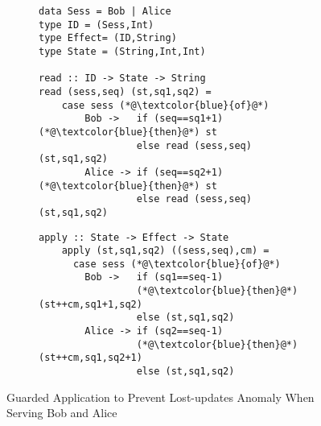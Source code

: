 \begin{figure}[t]
	\centering
	\begin{subfigure}[t]{0.5\textwidth}
	\begin{lstlisting}
data Sess = Bob | Alice
type ID = (Sess,Int) 
type Effect= (ID,String)
type State = (String,Int,Int)
	
read :: ID -> State -> String
read (sess,seq) (st,sq1,sq2) = 
	case sess (*@\textcolor{blue}{of}@*) 
		Bob ->   if (seq==sq1+1) (*@\textcolor{blue}{then}@*) st
		         else read (sess,seq)(st,sq1,sq2)
		Alice -> if (seq==sq2+1) (*@\textcolor{blue}{then}@*) st
		         else read (sess,seq)(st,sq1,sq2)
	\end{lstlisting}		  
	\end{subfigure}
	\hfill
	\begin{subfigure}[t]{0.42\textwidth}
	\begin{lstlisting}[firstnumber=13]
	apply :: State -> Effect -> State 
	apply (st,sq1,sq2) ((sess,seq),cm) = 
	  case sess (*@\textcolor{blue}{of}@*) 
	    Bob ->   if (sq1==seq-1)
	             (*@\textcolor{blue}{then}@*) (st++cm,sq1+1,sq2)
	             else (st,sq1,sq2)
	    Alice -> if (sq2==seq-1)
	             (*@\textcolor{blue}{then}@*) (st++cm,sq1,sq2+1)
	             else (st,sq1,sq2)
	\end{lstlisting}		  
        \end{subfigure}

	\hrulefill
	\caption{Guarded Application to Prevent Lost-updates Anomaly
	When Serving Bob and Alice}
	\label{fig:modified_code}
\end{figure}


